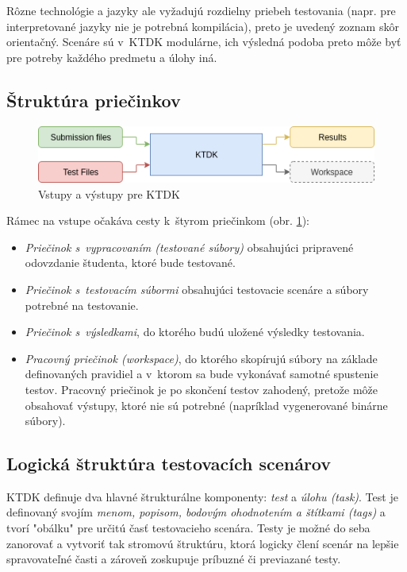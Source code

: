 \documentclass[
  digital, %
  oneside, %
  table,   %
  lof,     %
  lot,   %
]{fithesis3}
\begin{document}
Rôzne technológie a jazyky ale vyžadujú rozdielny priebeh testovania (napr. pre interpretované jazyky nie je potrebná kompilácia), preto je uvedený zoznam skôr orientačný. Scenáre sú v~KTDK modulárne, ich výsledná podoba preto môže byť pre potreby každého predmetu a úlohy iná. 

\subsection{Štruktúra priečinkov}

\begin{figure}[!ht]
  \begin{center}
    \includegraphics[width=\textwidth]{imgs/ktdk-io.png}
  \end{center}
    \caption{Vstupy a výstupy pre KTDK}
    \label{fig:ktdk-io}
\end{figure}

Rámec na vstupe očakáva cesty k~štyrom priečinkom (obr. \ref{fig:ktdk-io}):
\begin{itemize}
    \item \emph{Priečinok s~vypracovaním (testované súbory)} obsahujúci pripravené odovzdanie študenta, ktoré bude testované.
    \item \emph{Priečinok s~testovacím súbormi} obsahujúci testovacie scenáre a súbory potrebné na testovanie.
    \item \emph{Priečinok s~výsledkami}, do ktorého budú uložené výsledky testovania.
    \item \emph{Pracovný priečinok (workspace)}, do ktorého skopírujú súbory na základe definovaných pravidiel a v~ktorom sa bude vykonávať samotné spustenie testov. Pracovný priečinok je po skončení testov zahodený, pretože môže obsahovať výstupy, ktoré nie sú potrebné (napríklad vygenerované binárne súbory).
\end{itemize}

\subsection{Logická štruktúra testovacích scenárov}
\label{design-struct-test-scenarios}
KTDK definuje dva hlavné štrukturálne komponenty: \emph{test} a \emph{úlohu (task)}. Test je definovaný svojím \emph{menom, popisom, bodovým ohodnotením a štítkami (\emph{tags})} a tvorí "obálku" pre určitú časť testovacieho scenára. Testy je možné do seba zanorovať a vytvoriť tak stromovú štruktúru, ktorá logicky člení scenár na lepšie spravovateľné časti a zároveň zoskupuje príbuzné či previazané testy. 
\end{document}
